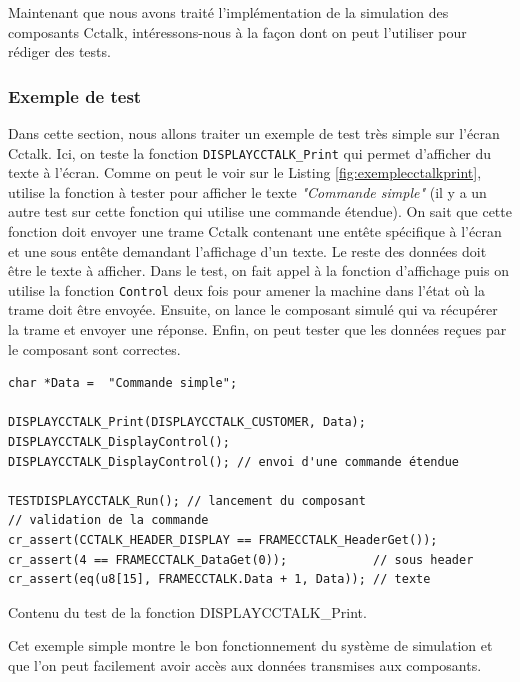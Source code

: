 \documentclass[a4paper]{article}
\begin{document}
Maintenant que nous avons traité l'implémentation de la simulation des
composants Cctalk, intéressons-nous à la façon dont on peut l'utiliser pour
rédiger des tests.

\subsubsection{Exemple de test}

Dans cette section, nous allons traiter un exemple de test très simple sur
l'écran Cctalk. Ici, on teste la fonction \verb|DISPLAYCCTALK_Print| qui permet
d'afficher du texte à l'écran. Comme on peut le voir sur le Listing
\ref{fig:exemplecctalkprint}, utilise la fonction à tester pour afficher le
texte \textit{"Commande simple"} (il y a un autre test sur cette fonction qui
utilise une commande étendue). On sait que cette fonction doit envoyer une trame
Cctalk contenant une entête spécifique à l'écran et une sous entête demandant
l'affichage d'un texte. Le reste des données doit être le texte à afficher. Dans
le test, on fait appel à la fonction d'affichage puis on utilise la fonction
\verb|Control| deux fois pour amener la machine dans l'état où la trame doit
être envoyée. Ensuite, on lance le composant simulé qui va récupérer la trame et
envoyer une réponse. Enfin, on peut tester que les données reçues par le composant
sont correctes.

\begin{listing}[ht!]
\begin{verbatim}
char *Data =  "Commande simple";

DISPLAYCCTALK_Print(DISPLAYCCTALK_CUSTOMER, Data);
DISPLAYCCTALK_DisplayControl();
DISPLAYCCTALK_DisplayControl(); // envoi d'une commande étendue

TESTDISPLAYCCTALK_Run(); // lancement du composant
// validation de la commande
cr_assert(CCTALK_HEADER_DISPLAY == FRAMECCTALK_HeaderGet());
cr_assert(4 == FRAMECCTALK_DataGet(0));            // sous header
cr_assert(eq(u8[15], FRAMECCTALK.Data + 1, Data)); // texte
\end{verbatim}
\caption{Contenu du test de la fonction DISPLAYCCTALK\_Print.}
\label{fig:exemplecctalkprint}
\end{listing}

Cet exemple simple montre le bon fonctionnement du système de simulation et que
l'on peut facilement avoir accès aux données transmises aux composants.
\\~\\
\end{document}
